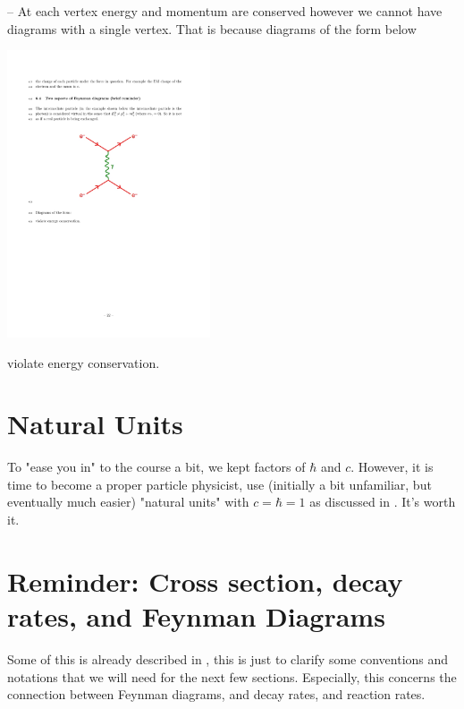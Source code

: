 -- At each vertex energy and momentum are conserved however we cannot have
diagrams with a single vertex. That is because diagrams of the form below 
\begin{center}
\includegraphics[width=0.45\textwidth]{fig/forcerange/qed_half.pdf}
\end{center}
violate energy conservation.\\







\section*{Natural Units}
To "ease you in" to the course a bit, we kept factors of $\hbar$ and $c$. However, it is time to become a proper particle physicist, use (initially a bit unfamiliar, but eventually much easier) "natural units" with $c=\hbar=1$ as discussed in . It's worth it.

\section{Reminder: Cross section, decay rates, and Feynman Diagrams}
Some of this is already described in , this is just to clarify some conventions and notations that we will need for the next few sections. Especially, this concerns the connection between Feynman diagrams, and decay rates, and reaction rates.

